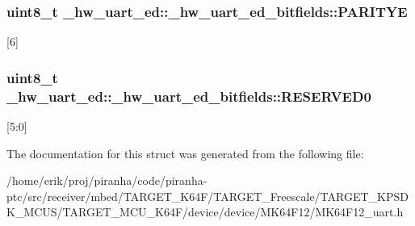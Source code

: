 \subsubsection[{\texorpdfstring{P\+A\+R\+I\+T\+YE}{PARITYE}}]{\setlength{\rightskip}{0pt plus 5cm}uint8\+\_\+t \+\_\+hw\+\_\+uart\+\_\+ed\+::\+\_\+hw\+\_\+uart\+\_\+ed\+\_\+bitfields\+::\+P\+A\+R\+I\+T\+YE}\hypertarget{struct__hw__uart__ed_1_1__hw__uart__ed__bitfields_a30b765beeb05182e99ae6754bf10c88d}{}\label{struct__hw__uart__ed_1_1__hw__uart__ed__bitfields_a30b765beeb05182e99ae6754bf10c88d}
\mbox{[}6\mbox{]} 
\subsubsection[{\texorpdfstring{R\+E\+S\+E\+R\+V\+E\+D0}{RESERVED0}}]{\setlength{\rightskip}{0pt plus 5cm}uint8\+\_\+t \+\_\+hw\+\_\+uart\+\_\+ed\+::\+\_\+hw\+\_\+uart\+\_\+ed\+\_\+bitfields\+::\+R\+E\+S\+E\+R\+V\+E\+D0}\hypertarget{struct__hw__uart__ed_1_1__hw__uart__ed__bitfields_a9595b740a35e232f1edd76f1bce8e490}{}\label{struct__hw__uart__ed_1_1__hw__uart__ed__bitfields_a9595b740a35e232f1edd76f1bce8e490}
\mbox{[}5\+:0\mbox{]} 

The documentation for this struct was generated from the following file\+:\begin{DoxyCompactItemize}
\item 
/home/erik/proj/piranha/code/piranha-\/ptc/src/receiver/mbed/\+T\+A\+R\+G\+E\+T\+\_\+\+K64\+F/\+T\+A\+R\+G\+E\+T\+\_\+\+Freescale/\+T\+A\+R\+G\+E\+T\+\_\+\+K\+P\+S\+D\+K\+\_\+\+M\+C\+U\+S/\+T\+A\+R\+G\+E\+T\+\_\+\+M\+C\+U\+\_\+\+K64\+F/device/device/\+M\+K64\+F12/M\+K64\+F12\+\_\+uart.\+h\end{DoxyCompactItemize}
